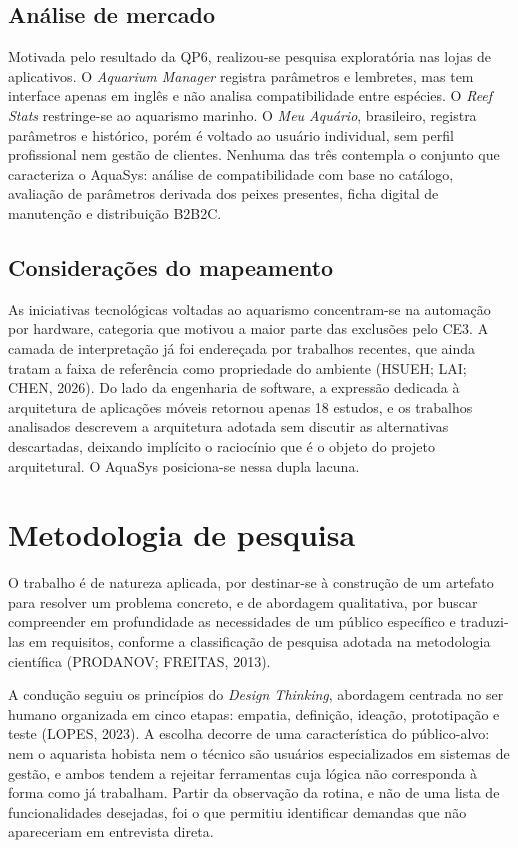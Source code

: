 \documentclass[12pt,oneside,a4paper,brazilian]{abntex2}
\begin{document}
\subsection{Análise de mercado}
Motivada pelo resultado da QP6, realizou-se pesquisa exploratória nas lojas de aplicativos. O \textit{Aquarium Manager} registra parâmetros e lembretes, mas tem interface apenas em inglês e não analisa compatibilidade entre espécies. O \textit{Reef Stats} restringe-se ao aquarismo marinho. O \textit{Meu Aquário}, brasileiro, registra parâmetros e histórico, porém é voltado ao usuário individual, sem perfil profissional nem gestão de clientes. Nenhuma das três contempla o conjunto que caracteriza o AquaSys: análise de compatibilidade com base no catálogo, avaliação de parâmetros derivada dos peixes presentes, ficha digital de manutenção e distribuição B2B2C.


\subsection{Considerações do mapeamento}
As iniciativas tecnológicas voltadas ao aquarismo concentram-se na automação por hardware, categoria que motivou a maior parte das exclusões pelo CE3. A camada de interpretação já foi endereçada por trabalhos recentes, que ainda tratam a faixa de referência como propriedade do ambiente (HSUEH; LAI; CHEN, 2026). Do lado da engenharia de software, a expressão dedicada à arquitetura de aplicações móveis retornou apenas 18 estudos, e os trabalhos analisados descrevem a arquitetura adotada sem discutir as alternativas descartadas, deixando implícito o raciocínio que é o objeto do projeto arquitetural. O AquaSys posiciona-se nessa dupla lacuna.


\section{Metodologia de pesquisa}
O trabalho é de natureza aplicada, por destinar-se à construção de um artefato para resolver um problema concreto, e de abordagem qualitativa, por buscar compreender em profundidade as necessidades de um público específico e traduzi-las em requisitos, conforme a classificação de pesquisa adotada na metodologia científica (PRODANOV; FREITAS, 2013).

A condução seguiu os princípios do \textit{Design Thinking}, abordagem centrada no ser humano organizada em cinco etapas: empatia, definição, ideação, prototipação e teste (LOPES, 2023). A escolha decorre de uma característica do público-alvo: nem o aquarista hobista nem o técnico são usuários especializados em sistemas de gestão, e ambos tendem a rejeitar ferramentas cuja lógica não corresponda à forma como já trabalham. Partir da observação da rotina, e não de uma lista de funcionalidades desejadas, foi o que permitiu identificar demandas que não apareceriam em entrevista direta.
\end{document}
